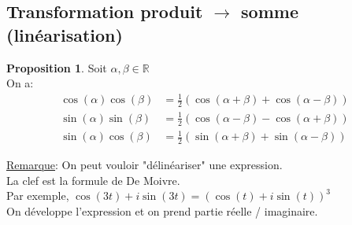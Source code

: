 \documentclass[10pt,a4paper]{article}
\theoremstyle{definition}
\newtheorem{proposition}{Proposition}[section]
\begin{document}
\subsection{Transformation produit $\rightarrow$ somme (linéarisation)}
\begin{proposition}
Soit $\alpha, \beta \in \mathbb{R}$ \\
On a:
\begin{align*}
\cos(\alpha)\cos(\beta) &= \frac{1}{2}(\cos(\alpha + \beta) + \cos(\alpha - \beta)) \\
\sin(\alpha)\sin(\beta) &= \frac{1}{2}(\cos(\alpha - \beta) - \cos(\alpha + \beta)) \\
\sin(\alpha)\cos(\beta) &= \frac{1}{2}(\sin(\alpha + \beta) + \sin(\alpha - \beta))
\end{align*}
\end{proposition}
\noindent \uline{Remarque}: On peut vouloir "délinéariser" une expression. \\
La clef est la formule de De Moivre. \\
Par exemple, $\cos(3t) + i\sin(3t) = (\cos(t) + i\sin(t))^3$\\
On développe l'expression et on prend partie réelle / imaginaire.
\end{document}
